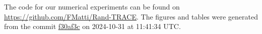 The code for our numerical experiments can be found on \url{https://github.com/FMatti/Rand-TRACE}. The figures and tables were generated from the commit \href{https://github.com/FMatti/Rand-TRACE/tree/f30af3c}{f30af3c} on 2024-10-31 at 11:41:34 UTC.

